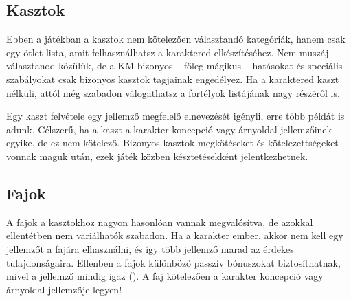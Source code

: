 \subsection{Kasztok}

Ebben a játékban a kasztok nem kötelezően választandó kategóriák, hanem csak egy ötlet lista, amit felhasználhatsz a karaktered elkészítéséhez. Nem muszáj választanod közülük, de a KM bizonyos -- főleg mágikus -- hatásokat és speciális szabályokat csak bizonyos kasztok tagjainak engedélyez. Ha a karaktered kaszt nélküli, attól még szabadon válogathatsz a fortélyok listájának nagy részéről is.

Egy kaszt felvétele egy jellemző megfelelő elnevezését igényli, erre több példát is adunk. Célszerű, ha a kaszt a karakter koncepció vagy árnyoldal jellemzőinek egyike, de ez nem kötelező. Bizonyos kasztok megkötéseket és kötelezettségeket vonnak maguk után, ezek játék közben késztetésekként jelentkezhetnek.

\subsection{Fajok}

A fajok a kasztokhoz nagyon hasonlóan vannak megvalósítva, de azokkal ellentétben nem variálhatók szabadon. Ha a karakter ember, akkor nem kell egy jellemzőt a fajára elhasználni, és így több jellemző marad az érdekes tulajdonságaira. Ellenben a fajok különböző passzív bónuszokat biztosíthatnak, mivel a jellemző mindig igaz (). A faj kötelezően a karakter koncepció vagy árnyoldal jellemzője legyen!
